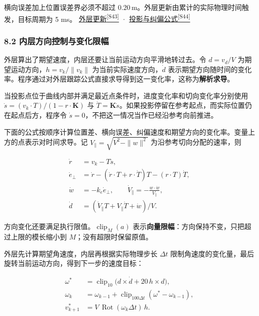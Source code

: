 \documentclass[11pt,a4paper]{article}
\numberwithin{equation}{topic}
\newcommand{\sourceref}[2]{\hyperlink{source-#1}{#2\textsuperscript{[#1]}}}
\begin{document}
横向误差加上位置误差界必须不超过 \(0.20\,\mathrm m\)。外层更新由累计的实际物理时间触发，目标周期为 5 ms。 \sourceref{S43}{外层更新} · \sourceref{S44}{投影与纠偏公式}

\subsubsection*{8.2 内层方向控制与变化限幅}

外层算出了期望速度，内层还要让当前运动方向平滑地转过去。令 \(d=v_d/V\) 为期望运动方向，\(h=v_k/\|v_k\|\) 为当前实际速度方向，\(\dot d\) 表示期望方向随时间的变化率。程序通过对外层跟踪公式直接求导得到这一变化率，这称为\textbf{解析求导}。

当投影点位于曲线内部并满足最近点条件时，进度变化率和切向变化率分别使用 \(\dot s=(v_k\cdot T)/(1-r\cdot\mathbf K)\) 与 \(\dot T=\mathbf K\dot s\)。如果投影停留在参考起点，而实际位置仍在起点后方，程序令 \(\dot s=0\)，不把这一情况当作已经沿参考向前推进。

下面的公式按顺序计算位置差、横向误差、纠偏速度和期望方向的变化率。变量上方的点表示对时间求导。记 \(V_\parallel=\sqrt{V^2-\|w\|^2}\) 为沿参考切向分配的速率，则

\begin{equation}
\label{eq:derivatives}
\begin{aligned}
\dot r&=v_k-T\dot s,\\
\dot e_\perp&=\dot r-
    (\dot r\cdot T+r\cdot\dot T)T-(r\cdot T)\dot T,\\
\dot w&=-k_e\dot e_\perp,\qquad
\dot V_\parallel=-\frac{w\cdot\dot w}{V_\parallel},\\
\dot d&=(\dot V_\parallel T+V_\parallel\dot T+\dot w)/V.
\end{aligned}
\end{equation}

方向变化还要满足执行限值。\(\operatorname{clip}_M(a)\) 表示\textbf{向量限幅}：方向保持不变，只把超过上限的模长缩小到 \(M\)；没有超限时保留原值。

外层先计算期望角速度，内层再根据实际物理步长 \(\Delta t\) 限制角速度的变化量，最后旋转当前运动方向，得到下一步的速度目标：

\begin{equation}
\label{eq:rotation}
\begin{aligned}
\omega^*&=\operatorname{clip}_{10}\bigl(d\times\dot d
                   +20\,h\times d\bigr),\\
\omega_k&=\omega_{k-1}
       +\operatorname{clip}_{100\Delta t}(\omega^*-\omega_{k-1}),\\
v^*_{k+1}&=V\,\operatorname{Rot}(\omega_k\Delta t)\,h.
\end{aligned}
\end{equation}
\end{document}
